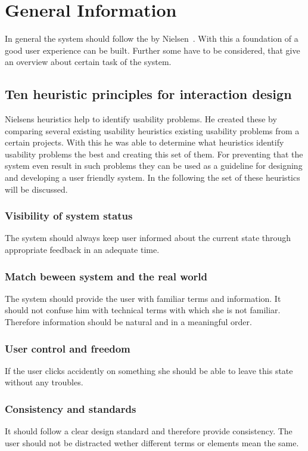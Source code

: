 \section{General Information}\label{4_2_general}
In general the system should follow the \textbf{} by Nielsen~\cite{Nielsen_1994-he}. With this a foundation of a good user experience can be built. Further some \textbf{} have to be considered, that give an overview about certain task of the system.

\subsection{Ten heuristic principles for interaction design}\label{nielsenDesignPrinciples}
Nielsens heuristics help to identify usability problems. He created these by comparing several existing usability heuristics existing usability problems from a certain projects. With this he was able to determine what heuristics identify usability problems the best and creating this set of them. For preventing that the system even result in such problems they can be used as a guideline for designing and developing a user friendly system. In the following the set of these heuristics will be discussed.
\subsubsection{Visibility of system status}
The system should always keep user informed about the current state through appropriate feedback in an adequate time.
\subsubsection{Match beween system and the real world}
The system should provide the user with familiar terms and information. It should not confuse him with technical terms with which she is not familiar. Therefore information should be natural and in a meaningful order.
\subsubsection{User control and freedom}
If the user clicks accidently on something she should be able to leave this state without any troubles.
\subsubsection{Consistency and standards}
It should follow a clear design standard and therefore provide consistency. The user should not be distracted wether different terms or elements mean the same.
